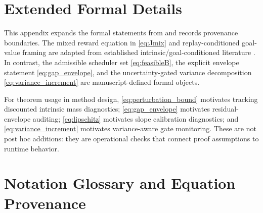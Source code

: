 \documentclass{article} %
\begin{document}
\section{Extended Formal Details}
\label{sec:appendix_formal}

This appendix expands the formal statements from  and records provenance boundaries. The mixed reward equation in \eqref{eq:Jmix} and replay-conditioned goal-value framing are adapted from established intrinsic/goal-conditioned literature \citep{arxiv1705_05363, arxiv1810_12894, arxiv1707_01495, arxiv2206_07568}. In contrast, the admissible scheduler set \eqref{eq:feasibleB}, the explicit envelope statement \eqref{eq:gap_envelope}, and the uncertainty-gated variance decomposition \eqref{eq:variance_increment} are manuscript-defined formal objects.

For theorem usage in method design, \eqref{eq:perturbation_bound} motivates tracking discounted intrinsic mass diagnostics; \eqref{eq:gap_envelope} motivates residual-envelope auditing; \eqref{eq:lipschitz} motivates slope calibration diagnostics; and \eqref{eq:variance_increment} motivates variance-aware gate monitoring. These are not post hoc additions: they are operational checks that connect proof assumptions to runtime behavior.

\section{Notation Glossary and Equation Provenance}
\label{sec:appendix_notation}
\end{document}
